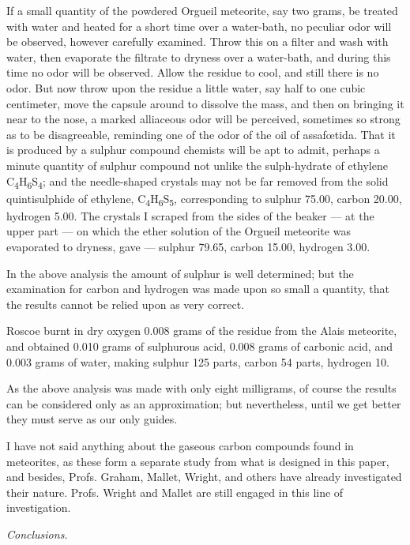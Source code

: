\documentclass[a4paper, 11pt, oneside, english]{article}
\begin{document}
If a small quantity of the powdered Orgueil meteorite, say two grams, be treated with water and heated for a short time over a water-bath, no peculiar odor will be observed, however carefully examined. Throw this on a filter and wash with water, then evaporate the filtrate to dryness over a water-bath, and during this time no odor will be observed. Allow the residue to cool, and still there is no odor. But now throw upon the residue a little water, say half to one cubic centimeter, move the capsule around to dissolve the mass, and then on bringing it near to the nose, a marked alliaceous odor will be perceived, sometimes so strong as to be disagreeable, reminding one of the odor of the oil of assafœtida. That it is produced by a sulphur compound chemists will be apt to admit, perhaps a minute quantity of sulphur compound not unlike the sulph-hydrate of ethylene C\textsubscript{4}H\textsubscript{6}S\textsubscript{4}; and the needle-shaped crystals may not be far removed from the solid quintisulphide of ethylene, C\textsubscript{4}H\textsubscript{6}S\textsubscript{5}, corresponding to sulphur 75.00, carbon 20.00, hydrogen 5.00. The crystals I scraped from the sides of the beaker --- at the upper part --- on which the ether solution of the Orgueil meteorite was evaporated to dryness, gave --- sulphur 79.65, carbon 15.00, hydrogen 3.00.

In the above analysis the amount of sulphur is well determined; but the examination for carbon and hydrogen was made upon so small a quantity, that the results cannot be relied upon as very correct.

Roscoe burnt in dry oxygen 0.008 grams of the residue from the Alais meteorite, and obtained 0.010 grams of sulphurous acid, 0.008 grams of carbonic acid, and 0.003 grams of water, making sulphur 125 parts, carbon 54 parts, hydrogen 10.

As the above analysis was made with only eight milligrams, of course the results can be considered only as an approximation; but nevertheless, until we get better they must serve as our only guides.

I have not said anything about the gaseous carbon compounds found in meteorites, as these form a separate study from what is designed in this paper, and besides, Profs. Graham, Mallet, Wright, and others have already investigated their nature. Profs. Wright and Mallet are still engaged in this line of investigation.
\begin{center}
\emph{Conclusions.}
\end{center}
\end{document}
